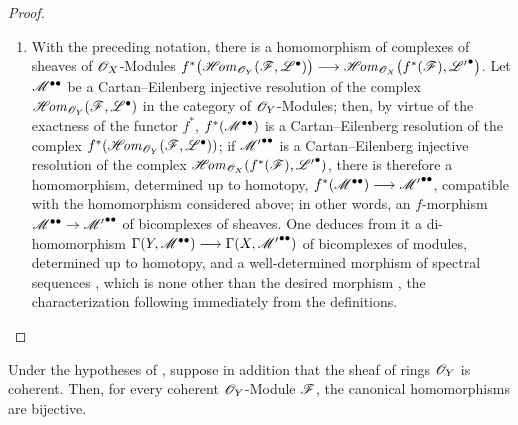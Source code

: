 \begin{proof}
\begin{enumerate}
  \item[\rm(ii)]
  With the preceding notation, there is a homomorphism of complexes of
  sheaves of $\mathscr{O}_X$-Modules $f^*\bigl(\mathscr{H}\!\mathit{om}_{\mathscr{O}_Y}(\mathscr{F},\mathscr{L}^\bullet)\bigr)
\longrightarrow
\mathscr{H}\!\mathit{om}_{\mathscr{O}_X}
\bigl(f^*(\mathscr{F}),{\mathscr{L}'}^\bullet\bigr)$.
  Let $\mathscr{M}^{\bullet\bullet}$ be a Cartan--Eilenberg injective
  resolution of the complex
  $\mathscr{H}\!\mathit{om}_{\mathscr{O}_Y}(\mathscr{F},\mathscr{L}^\bullet)$ in the category of
  $\mathscr{O}_Y$-Modules; then, by virtue of the exactness of the functor $f^*$,
  $f^*(\mathscr{M}^{\bullet\bullet})$ is a Cartan--Eilenberg resolution of the complex
  $f^*(\mathscr{H}\!\mathit{om}_{\mathscr{O}_Y}(\mathscr{F},\mathscr{L}^\bullet))$;
  if ${\mathscr{M}'}^{\bullet\bullet}$ is a Cartan--Eilenberg injective
  resolution of the complex
  $\mathscr{H}\!\mathit{om}_{\mathscr{O}_X}(f^*(\mathscr{F}),{\mathscr{L}'}^\bullet)$, there is therefore
   a homomorphism, determined up to homotopy, $f^*(\mathscr{M}^{\bullet\bullet})
\longrightarrow{\mathscr{M}'}^{\bullet\bullet}$,
  compatible with the homomorphism considered above; in other words,
  an $f$-morphism
  $\mathscr{M}^{\bullet\bullet}\to{\mathscr{M}'}^{\bullet\bullet}$ of
  bicomplexes of sheaves.
  One deduces from it a di-homomorphism $\Gamma(Y,\mathscr{M}^{\bullet\bullet})
\longrightarrow\Gamma(X,{\mathscr{M}'}^{\bullet\bullet})$
  of bicomplexes of modules, determined up to homotopy, and
  a well-determined morphism of spectral sequences
  , which is none other than the desired morphism
  , the characterization
   following immediately from the definitions.
\end{enumerate}
\end{proof}

\begin{proposition}[12.3.5]
\label{0.12.3.5}
Under the hypotheses of , suppose in addition that the
sheaf of rings $\mathscr{O}_Y$ is coherent.
Then, for every coherent $\mathscr{O}_Y$-Module $\mathscr{F}$, the canonical
homomorphisms  are bijective.
\end{proposition}

